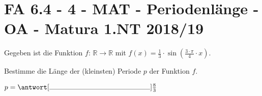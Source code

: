 \section{FA 6.4 - 4 - MAT - Periodenlänge - OA - Matura 1.NT 2018/19}

\begin{beispiel}[FA 6.4]{1}
Gegeben ist die Funktion $f$: $\mathbb{R}\rightarrow\mathbb{R}$ mit $f(x)=\frac{1}{3}\cdot\sin\left(\frac{3\cdot\pi}{4}\cdot x\right)$.

Bestimme die Länge der (kleinsten) Periode $p$ der Funktion $f$.\leer

$p=\antwort[\rule{5cm}{0.3pt}]{\frac{8}{3}}$

\end{beispiel}